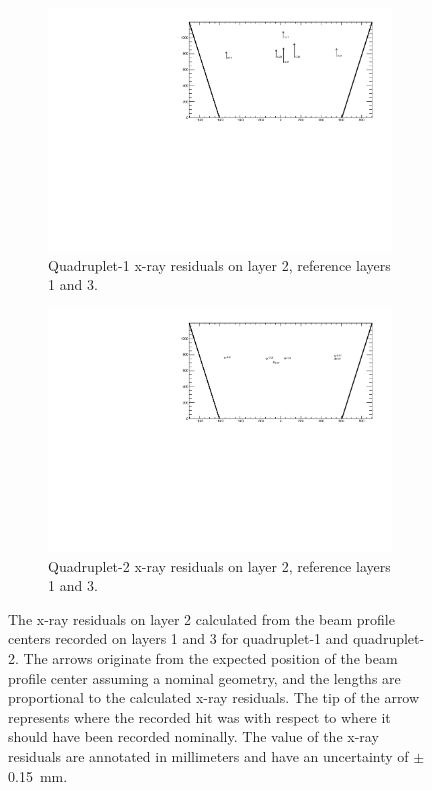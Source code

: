 \newpage
\thispagestyle{empty}
\begin{figure}
\centering
\begin{subfigure}{\textwidth}
  \centering
  \includegraphics[width=\linewidth]{figures/QL2P11_xray_residuals_layer2_fixedlayers13.pdf}
  \caption{Quadruplet-1 x-ray residuals on layer 2, reference layers 1 and 3.}
  \label{fig:xray_res_th2_ql2p11}
\end{subfigure}%
\vspace*{\floatsep}
\begin{subfigure}{\textwidth}
  \centering
  \includegraphics[width=\linewidth]{figures/QL2P08_xray_residuals_layer2_fixedlayers13.pdf}
  \caption{Quadruplet-2 x-ray residuals on layer 2, reference layers 1 and 3.}
  \label{fig:xray_res_th2_ql2p8}
\end{subfigure}
\caption{The x-ray residuals on layer 2 calculated from the beam profile centers recorded on layers 1 and 3 for quadruplet-1 and quadruplet-2. The arrows originate from the expected position of the beam profile center assuming a nominal geometry, and the lengths are proportional to the calculated x-ray residuals. The tip of the arrow represents where the recorded hit was with respect to where it should have been recorded nominally. The value of the x-ray residuals are annotated in millimeters and have an uncertainty of $\pm$\SI{0.15}{mm}.}
\label{fig:xray_res_th2}
\end{figure}
\newpage
\restoregeometry

